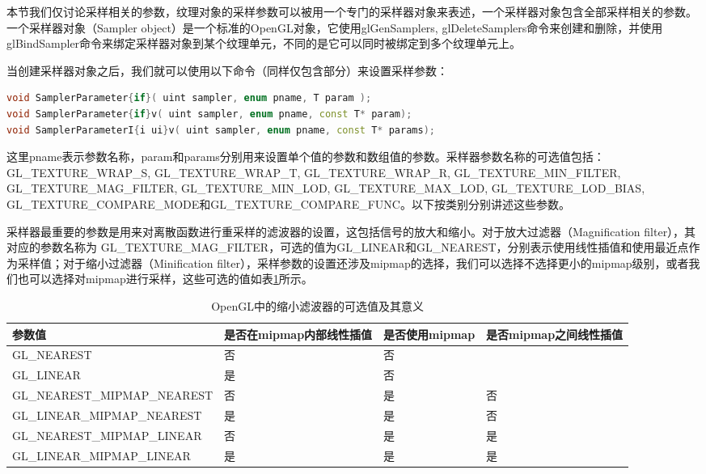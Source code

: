 本节我们仅讨论采样相关的参数，纹理对象的采样参数可以被用一个专门的采样器对象来表述，一个采样器对象包含全部采样相关的参数。一个采样器对象（Sampler object）是一个标准的OpenGL对象，它使用glGenSamplers, glDeleteSamplers命令来创建和删除，并使用glBindSampler命令来绑定采样器对象到某个纹理单元，不同的是它可以同时被绑定到多个纹理单元上。

当创建采样器对象之后，我们就可以使用以下命令（同样仅包含部分）来设置采样参数：

\begin{lstlisting}[language=C++]
void SamplerParameter{if}( uint sampler, enum pname, T param );
void SamplerParameter{if}v( uint sampler, enum pname, const T* param);
void SamplerParameterI{i ui}v( uint sampler, enum pname, const T* params);
\end{lstlisting}

这里pname表示参数名称，param和params分别用来设置单个值的参数和数组值的参数。采样器参数名称的可选值包括：GL\_TEXTURE\_WRAP\_S, GL\_TEXTURE\_WRAP\_T, GL\_TEXTURE\_WRAP\_R, GL\_TEXTURE\_MIN\_FILTER, GL\_TEXTURE\_MAG\_FILTER, GL\_TEXTURE\_MIN\_LOD, GL\_TEXTURE\_MAX\_LOD, GL\_TEXTURE\_LOD\_BIAS, GL\_TEXTURE\_COMPARE\_MODE和GL\_TEXTURE\_COMPARE\_FUNC。以下按类别分别讲述这些参数。

采样器最重要的参数是用来对离散函数进行重采样的滤波器的设置，这包括信号的放大和缩小。对于放大过滤器（Magnification filter），其对应的参数名称为 GL\_TEXTURE\_MAG\_FILTER，可选的值为GL\_LINEAR和GL\_NEAREST，分别表示使用线性插值和使用最近点作为采样值；对于缩小过滤器（Minification filter），采样参数的设置还涉及mipmap的选择，我们可以选择不选择更小的mipmap级别，或者我们也可以选择对mipmap进行采样，这些可选的值如表\ref{t:api-minification-filter}所示。

\begin{table}
\caption{OpenGL中的缩小滤波器的可选值及其意义}
\label{t:api-minification-filter}
\centering
\begin{tabular}{>{\small}p{}|>{\small}p{}|>{\small}p{}|>{\small}p{}}
\hline 
   参数值 & 是否在mipmap内部线性插值 & 是否使用mipmap & 是否mipmap之间线性插值\\
    \hline  
    GL\_NEAREST                  &  否   &  否   &\\
    GL\_LINEAR                   &  是   &  否   &\\
    GL\_NEAREST\_MIPMAP\_NEAREST &  否   &  是   &否\\
    GL\_LINEAR\_MIPMAP\_NEAREST  &  是   &  是   &否\\
    GL\_NEAREST\_MIPMAP\_LINEAR  &  否   &  是   &是\\
    GL\_LINEAR\_MIPMAP\_LINEAR   &  是   &  是   &是\\

 \hline 
\end{tabular}
\end{table}

